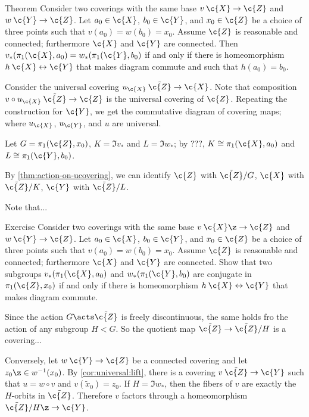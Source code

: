 \begin{thm}{Theorem}\label{thm:classification-coverings}
Consider two coverings with the same base $v\:\c{X}\to \c{Z}$ and $w\:\c{Y}\to \c{Z}$.
Let $a_0\in \c{X}$, $b_0\in \c{Y}$, and $x_0\in \c{Z}$ be a choice of three  points such that $v(a_0)=w(b_0)=x_0$.
Assume $\c{Z}$ is reasonable and connected;
furthermore $\c{X}$ and $\c{Y}$ are connected.
Then $v_*(\pi_1(\c{X},a_0)=w_*(\pi_1(\c{Y},b_0)$ if and only if there is homeomorphism $h\:\c{X}\leftrightarrow \c{Y}$ that makes diagram commute and such that $h(a_0)=b_0$.
\end{thm}

Consider the universal covering $u_{\c{X}}\:\tilde{\c{Z}}\to \c{X}$.
Note that composition $v\circ u_{\c{X}}\:\tilde{\c{Z}}\to \c{Z}$ is the universal covering of $\c{Z}$.
Repeating the construction for $\c{Y}$, we get the commutative diagram of covering maps;
where $u_{\c{X}}$, $u_{\c{Y}}$, and $u$ are universal.

Let $G=\pi_1(\c{Z},x_0)$, $K=\Im v_*$ and $L=\Im w_*$;
by ???, $K\cong \pi_1(\c{X},a_0)$ and $L\cong \pi_1(\c{Y},b_0)$.

By \ref{thm:action-on-ucovering}, we can identify
$\c{Z}$ with $\tilde{\c{Z}}/G$,
$\c{X}$ with $\tilde{\c{Z}}/K$,
$\c{Y}$ with $\tilde{\c{Z}}/L$.

Note that...
\qeds

\begin{thm}{Exercise}
Consider two coverings with the same base $v\:\c{X}\z\to \c{Z}$ and $w\:\c{Y}\to \c{Z}$.
Let $a_0\in \c{X}$, $b_0\in \c{Y}$, and $x_0\in \c{Z}$ be a choice of three  points such that $v(a_0)=w(b_0)=x_0$.
Assume $\c{Z}$ is reasonable and connected;
furthermore $\c{X}$ and $\c{Y}$ are connected.
Show that two subgroups $v_*(\pi_1(\c{X},a_0)$ and $w_*(\pi_1(\c{Y},b_0)$ are conjugate in $\pi_1(\c{Z},x_0)$
if and only if there is homeomorphism $h\:\c{X}\leftrightarrow \c{Y}$ that makes diagram commute.
\end{thm}




Since the action $G\acts\tilde{\c{Z}}$ is freely discontinuous,
the same holds fro the action of any subgroup $H<G$.
So the quotient map $\tilde{\c{Z}}\to \tilde{\c{Z}}/H$ is a covering...

Conversely, let $w\:\c{Y}\to \c{Z}$ be a connected covering and let $z_0\z\in w^{-1}(x_0)$.
By \ref{cor:universal:lift}, there is a covering $v\:\tilde{\c{Z}}\to \c{Y}$ such that $u=w\circ v$ and $v(\tilde x_0)=z_0$.
If $H=\Im w_*$, then the fibers of $v$ are exactly the $H$-orbits in $\tilde{\c{Z}}$.
Therefore $v$ factors through a homeomorphism $\tilde{\c{Z}}/H\z\to \c{Y}$.
\qeds

















